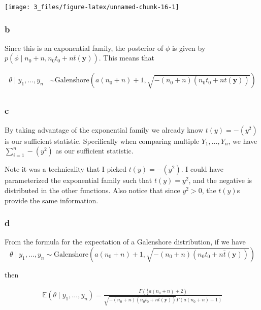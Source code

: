 \documentclass[]{article}
\begin{document}
\begin{center}\texttt{[image: 3\_files/figure-latex/unnamed-chunk-16-1]} \end{center}

\hypertarget{b-4}{%
\subsubsection{b}\label{b-4}}

Since this is an exponential family, the posterior of \(\phi\) is given
by \(p(\phi \mid n_0 + n, n_0 t_0 + n\bar{t}(\mathbf{y}))\). This means
that

\begin{align}
\theta \mid y_1, \dots, y_n &\sim \text{Galenshore}\left(a (n_0 + n) + 1, \sqrt{- (n_0 + n) (n_0 t_0 + n \bar{t}(\mathbf{y}))} \right) \\
\end{align}

\hypertarget{c-3}{%
\subsubsection{c}\label{c-3}}

By taking advantage of the exponential family we already know
\(t(y) = -(y^2)\) is our sufficient statistic. Specifically when
comparing multiple \(Y_1, \dots, Y_n\), we have
\(\sum_{i = 1}^n - (y^2)\) as our sufficient statistic.

Note it was a technicality that I picked \(t(y) = -(y^2)\). I could have
parameterized the exponential family such that \(t(y) = y^2\), and the
negative is distributed in the other functions. Also notice that since
\(y^2 > 0\), the \(t(y)\)s provide the same information.

\hypertarget{d-2}{%
\subsubsection{d}\label{d-2}}

From the formula for the expectation of a Galenshore distribution, if we
have
\[\theta \mid y_1, \dots, y_n \sim \text{Galenshore}\left(a (n_0 + n) + 1, \sqrt{- (n_0 + n) (n_0 t_0 + n \bar{t}(\mathbf{y}))} \right)\]

then

\begin{align}
\mathbb{E}(\theta \mid y_1, \dots, y_n) = \frac{\Gamma\left(\frac{1}{2} a(n_0 + n) + 2 \right)}{ \sqrt{- (n_0 + n) (n_0 t_0 + n \bar{t}(\mathbf{y}))} \Gamma\left( a(n_0 + n) + 1 \right)}
\end{align}
\end{document}
